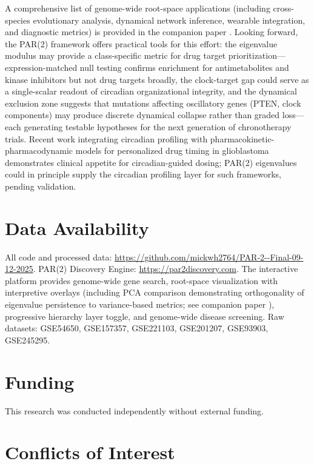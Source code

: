 \documentclass[11pt,letterpaper]{article}
\begin{document}
\noindent A comprehensive list of genome-wide root-space applications (including cross-species evolutionary analysis, dynamical network inference, wearable integration, and diagnostic metrics) is provided in the companion paper \citep{whiteside2026paper1}. Looking forward, the PAR(2) framework offers practical tools for this effort: the eigenvalue modulus may provide a class-specific metric for drug target prioritization---expression-matched null testing confirms enrichment for antimetabolites and kinase inhibitors but not drug targets broadly, the clock-target gap could serve as a single-scalar readout of circadian organizational integrity, and the dynamical exclusion zone suggests that mutations affecting oscillatory genes (PTEN, clock components) may produce discrete dynamical collapse rather than graded loss---each generating testable hypotheses for the next generation of chronotherapy trials. Recent work integrating circadian profiling with pharmacokinetic-pharmacodynamic models for personalized drug timing in glioblastoma \citep{fujimoto2025} demonstrates clinical appetite for circadian-guided dosing; PAR(2) eigenvalues could in principle supply the circadian profiling layer for such frameworks, pending validation.

\section*{Data Availability}

All code and processed data: \url{https://github.com/mickwh2764/PAR-2--Final-09-12-2025}. PAR(2) Discovery Engine: \url{https://par2discovery.com}. The interactive platform provides genome-wide gene search, root-space visualization with interpretive overlays (including PCA comparison demonstrating orthogonality of eigenvalue persistence to variance-based metrics; see companion paper \citep{whiteside2026paper1}), progressive hierarchy layer toggle, and genome-wide disease screening. Raw datasets: GSE54650, GSE157357, GSE221103, GSE201207, GSE93903, GSE245295.

\section*{Funding}

This research was conducted independently without external funding.

\section*{Conflicts of Interest}
\end{document}
